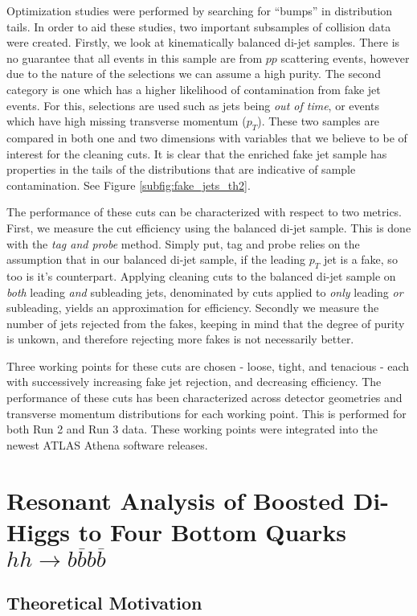 \documentclass[12pt]{article}
\begin{document}
Optimization studies were performed by searching for ``bumps'' in
distribution tails. In order to aid these studies, two important subsamples of
collision data were created. Firstly, we look at kinematically balanced di-jet
samples. There is no guarantee that all events in this sample are from $pp$
scattering events, however due to the nature of the selections we can assume a
high purity. The second category is one which has a higher likelihood of
contamination from fake jet events. For this, selections are used such as jets
being \textit{out of time}, or events which have high missing transverse
momentum ($p_T$). These two samples are compared in both one and two dimensions with
variables that we believe to be of interest for the cleaning cuts. It is clear
that the enriched fake jet sample has properties in the tails of the
distributions that are indicative of sample contamination. See Figure
\ref{subfig:fake_jets_th2}. 

The performance of these cuts can be characterized with respect to two metrics.
First, we measure the cut efficiency using the balanced di-jet sample. This is
done with the \textit{tag and probe} method. Simply put, tag and probe relies on
the assumption that in our balanced di-jet sample, if the leading $p_T$ jet is a
fake, so too is it's counterpart. Applying cleaning cuts to the balanced di-jet
sample on \textit{both} leading \textit{and} subleading jets, denominated by
cuts applied to \textit{only} leading \textit{or} subleading, yields an
approximation for efficiency. Secondly we measure the number of jets rejected
from the fakes, keeping in mind that the degree of purity is unkown, and
therefore rejecting more fakes is not necessarily better.  

Three working points for these cuts are chosen - loose, tight, and tenacious -
each with successively increasing fake jet rejection, and decreasing efficiency.
The performance of these cuts has been characterized across detector geometries
and transverse momentum distributions for each working point. This is performed
for both Run 2 and Run 3 data. These working points were integrated into the
newest ATLAS Athena software \cite{atlas_simulation} releases.

\section{Resonant Analysis of Boosted Di-Higgs to Four Bottom Quarks
$hh\rightarrow b\overline{b}b\overline{b}$}
\subsection{Theoretical Motivation}
\end{document}
